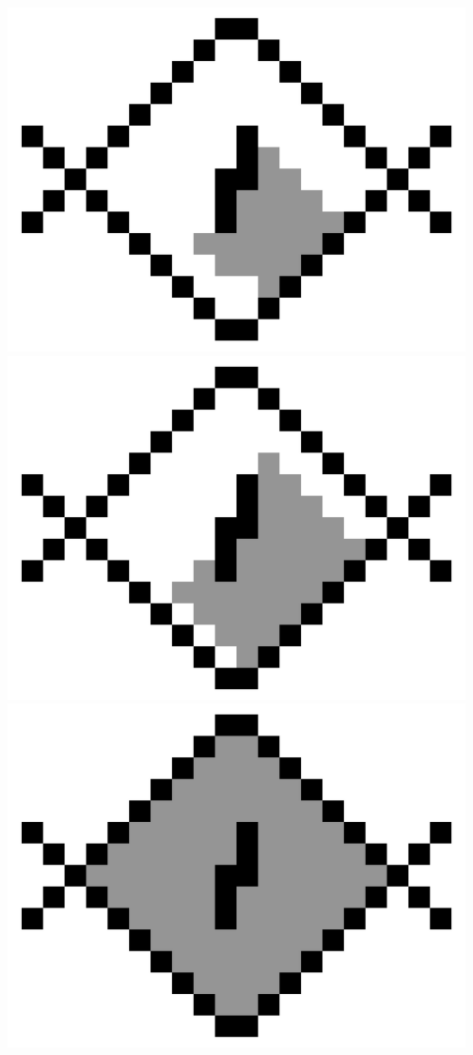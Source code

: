 \documentclass[11pt,class=report,crop=false]{standalone}
\begin{document}
\begin{center}
	\includegraphics[scale=\myscale,scale=0.15]{figures/fill01_050}\quad
	\includegraphics[scale=\myscale,scale=0.15]{figures/fill01_112}\quad
	\includegraphics[scale=\myscale,scale=0.15]{figures/fill01_368}
\end{center}
	
\end{document}
